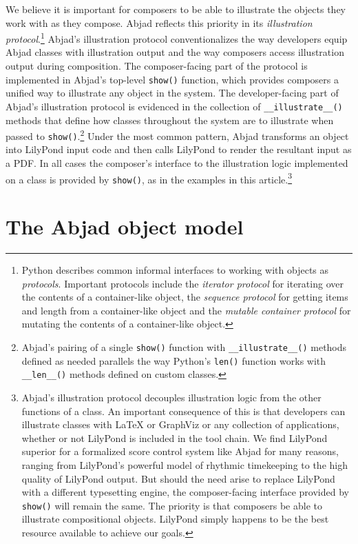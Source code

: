 \documentclass{article}
\begin{document}
We believe it is important for composers to be able to illustrate the objects
they work with as they compose. Abjad reflects this priority in its
\emph{illustration protocol}.\footnote{Python describes common informal
interfaces to working with objects as \emph{protocols}. Important protocols
include the \emph{iterator protocol} for iterating over the contents of a
container-like object, the \emph{sequence protocol} for getting items and
length from a container-like object and the \emph{mutable container protocol}
for mutating the contents of a container-like object.} Abjad's illustration
protocol conventionalizes the way developers equip Abjad classes with
illustration output and the way composers access illustration output during
composition. The composer-facing part of the protocol is implemented in Abjad's
top-level \texttt{show()} function, which provides composers a unified way to
illustrate any object in the system. The developer-facing part of Abjad's
illustration protocol is evidenced in the collection of
\texttt{\_\_illustrate\_\_()} methods that define how classes throughout the
system are to illustrate when passed to \texttt{show()}.\footnote{Abjad's
pairing of a single \texttt{show()} function with \texttt{\_\_illustrate\_\_()}
methods defined as needed parallels the way Python's \texttt{len()} function
works with \texttt{\_\_len\_\_()} methods defined on custom classes.} Under the
most common pattern, Abjad transforms an object into LilyPond input code and
then calls LilyPond to render the resultant input as a PDF. In all cases the
composer's interface to the illustration logic implemented on a  class is
provided by \texttt{show()}, as in the examples in this
article.\footnote{Abjad's illustration protocol decouples illustration logic
from the other functions of a class. An important consequence of this is that
developers can illustrate classes with LaTeX or GraphViz or any collection of
applications, whether or not LilyPond is included in the tool chain. We find
LilyPond superior for a formalized score control system like Abjad for many
reasons, ranging from LilyPond's powerful model of rhythmic timekeeping to the
high quality of LilyPond output. But should the need arise to replace LilyPond
with a different typesetting engine, the composer-facing  interface provided by
\texttt{show()} will remain the same. The priority is that composers be able to
illustrate compositional objects. LilyPond simply happens to be the best
resource available to achieve our goals.}

\section{The Abjad object model} \label{sec:object-model}
\end{document}
